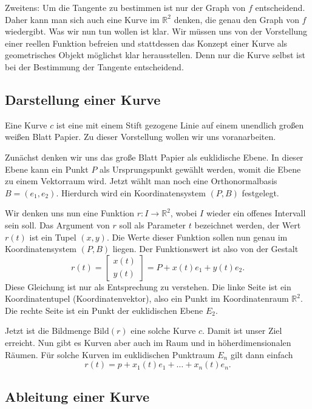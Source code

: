 \documentclass[a4paper,12pt,fleqn]{article}
\begin{document}
Zweitens: Um die Tangente zu bestimmen ist nur der Graph von $f$
entscheidend. Daher kann man sich auch eine Kurve im $\mathbb R^2$
denken, die genau den Graph von $f$ wiedergibt. Was wir nun tun
wollen ist klar. Wir müssen uns von der Vorstellung einer reellen
Funktion befreien und stattdessen das Konzept einer Kurve als
geometrisches Objekt möglichst klar herausstellen. Denn nur die
Kurve selbst ist bei der Bestimmung der Tangente entscheidend.

\subsection{Darstellung einer Kurve}

Eine Kurve $c$ ist eine mit einem Stift gezogene Linie auf einem
unendlich großen weißen Blatt Papier. Zu dieser Vorstellung wollen
wir uns voranarbeiten.

Zunächst denken wir uns das große Blatt Papier als euklidische
Ebene. In dieser Ebene kann ein Punkt $P$ als Ursprungspunkt
gewählt werden, womit die Ebene zu einem Vektorraum wird.
Jetzt wählt man noch eine Orthonormalbasis $B=(e_1,e_2)$.
Hierdurch wird ein Koordinatensystem $(P,B)$ festgelegt.

Wir denken uns nun eine Funktion $r\colon I\to\mathbb R^2$,
wobei $I$ wieder ein offenes Intervall sein soll.
Das Argument von $r$ soll als Parameter $t$ bezeichnet werden,
der Wert $r(t)$ ist ein Tupel $(x,y)$. Die Werte dieser Funktion
sollen nun genau im Koordinatensystem $(P,B)$ liegen. Der
Funktionswert ist also von der Gestalt
\begin{equation}
r(t) = \begin{bmatrix}
x(t)\\ y(t)
\end{bmatrix}
= P+x(t)e_1+y(t)e_2.
\end{equation}
Diese Gleichung ist nur als Entsprechung zu verstehen. Die linke Seite
ist ein Koordinatentupel (Koordinatenvektor), also ein Punkt im
Koordinatenraum $\mathbb R^2$. Die rechte Seite
ist ein Punkt der euklidischen Ebene $E_2$.

Jetzt ist die Bildmenge $\mathrm{Bild}(r)$ eine solche
Kurve $c$. Damit ist unser Ziel erreicht. Nun gibt es Kurven
aber auch im Raum und in höherdimensionalen Räumen. Für solche
Kurven im euklidischen Punktraum $E_n$ gilt dann einfach%
\begin{equation}
r(t) = p+x_1(t)e_1+\ldots+x_n(t)e_n.
\end{equation}

\subsection{Ableitung einer Kurve}
\end{document}

